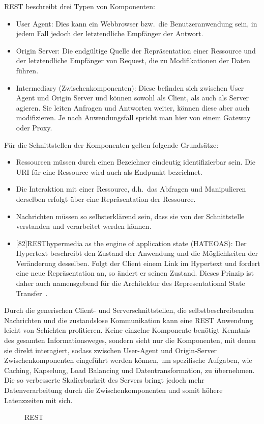 REST beschreibt drei Typen von Komponenten:\cite[vgl.][96]{REST}
\begin{itemize}
  \item User Agent:
  Dies kann ein Webbrowser bzw.\ die Benutzeranwendung sein, in jedem Fall jedoch der letztendliche Empfänger der Antwort.
  \item Origin Server:
  Die endgültige Quelle der Repräsentation einer Ressource und der letztendliche Empfänger von Request, die zu Modifikationen der Daten führen.
  \item Intermediary (Zwischenkomponenten):
  Diese befinden sich zwischen User Agent und Origin Server und können sowohl als Client, als auch als Server agieren. Sie leiten Anfragen und Antworten weiter, können diese aber auch modifizieren. Je nach Anwendungsfall spricht man hier von einem Gateway oder Proxy.
\end{itemize}
Für die Schnittstellen der Komponenten gelten folgende Grundsätze:\cite[vgl.][82]{REST}
\begin{itemize}
  \item Ressourcen müssen durch einen Bezeichner eindeutig identifizierbar sein.
  Die URI für eine Ressource wird auch als Endpunkt bezeichnet.
  \item Die Interaktion mit einer Ressource, d.h.\ das Abfragen und Manipulieren derselben erfolgt über eine Repräsentation der Ressource.
  \item Nachrichten müssen so selbsterklärend sein, dass sie von der Schnittstelle verstanden und verarbeitet werden können.
  \item {}[82]{REST}{hypermedia as the engine of application state} (HATEOAS): Der Hypertext beschreibt den Zustand der Anwendung und die Möglichkeiten der Veränderung desselben.
  Folgt der Client einem Link im Hypertext und fordert eine neue Repräsentation an, so ändert er seinen Zustand.
  Dieses Prinzip ist daher auch namensgebend für die Architektur des Representational State Transfer~\cite[vgl.][103f.]{SOA}.
\end{itemize}
\par
Durch die generischen Client- und Serverschnittstellen, die selbstbeschreibenden Nachrichten und die zustandslose Kommunikation kann eine REST Anwendung leicht von Schichten profitieren.
Keine einzelne Komponente benötigt Kenntnis des gesamten Informationsweges, sondern sieht nur die Komponenten, mit denen sie direkt interagiert, sodass zwischen
User-Agent und Origin-Server Zwischenkomponenten eingeführt werden können, um spezifische Aufgaben, wie Caching, Kapselung, Load Balancing und Datentransformation, zu übernehmen.\cite[vgl.][99]{REST}
Die so verbesserte Skalierbarkeit des Servers bringt jedoch mehr Datenverarbeitung durch die Zwischenkomponenten und somit höhere Latenzzeiten mit sich.\cite[vgl.][83,98]{REST}
\begin{figure}[h]
  \centering
  \caption{REST~\cite[84]{REST}}\label{img:REST-diss}
\end{figure}

